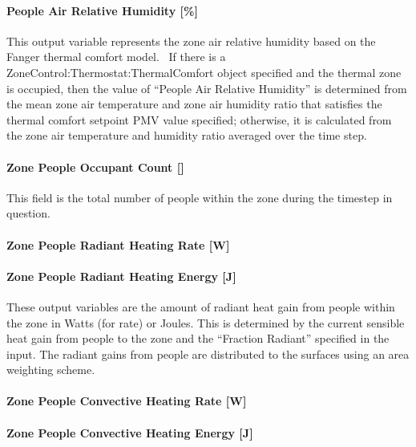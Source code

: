 \paragraph{People Air Relative Humidity {[}\%{]}}\label{people-air-relative-humidity}

This output variable represents the zone air relative humidity based on the Fanger thermal comfort model.~ If there is a ZoneControl:Thermostat:ThermalComfort object specified and the thermal zone is occupied, then the value of ``People Air Relative Humidity'' is determined from the mean zone air temperature and zone air humidity ratio that satisfies the thermal comfort setpoint PMV value specified; otherwise, it is calculated from the zone air temperature and humidity ratio averaged over the time step.

\paragraph{Zone People Occupant Count {[]}}\label{zone-people-occupant-count}

This field is the total number of people within the zone during the timestep in question.

\paragraph{Zone People Radiant Heating Rate {[}W{]}}\label{zone-people-radiant-heating-rate-w}

\paragraph{Zone People Radiant Heating Energy {[}J{]}}\label{zone-people-radiant-heating-energy-j}

These output variables are the amount of radiant heat gain from people within the zone in Watts (for rate) or Joules. This is determined by the current sensible heat gain from people to the zone and the ``Fraction Radiant'' specified in the input. The radiant gains from people are distributed to the surfaces using an area weighting scheme.

\paragraph{Zone People Convective Heating Rate {[}W{]}}\label{zone-people-convective-heating-rate-w}

\paragraph{Zone People Convective Heating Energy {[}J{]}}\label{zone-people-convective-heating-energy-j}

